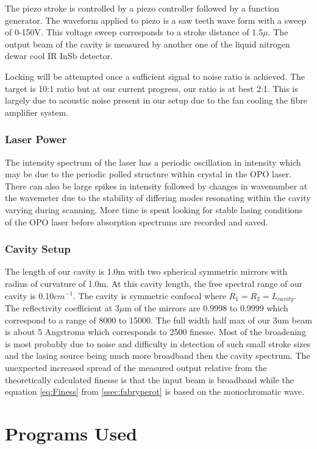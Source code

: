 \documentclass[a4paper]{book}
\begin{document}
		The piezo stroke is controlled by a piezo controller followed by a function generator. The waveform applied to piezo is a saw teeth wave form with a sweep of 0-150V. This voltage sweep corresponds to a stroke distance of 1.5$\mu$. The output beam of the cavity is measured by another one of the liquid nitrogen dewar cool IR InSb detector. 
		
		Locking will be attempted once a sufficient signal to noise ratio is achieved. The target is 10:1 ratio but at our current progress, our ratio is at best 2:1. This is largely due to acoustic noise present in our setup due to the fan cooling the fibre amplifier system.

		\subsubsection{Laser Power}
			The intensity spectrum of the laser has a periodic oscillation in intensity which may be due to the periodic polled structure within crystal in the OPO laser. There can also be large spikes in intensity followed by changes in wavenumber at the wavemeter due to the stability of differing modes resonating within the cavity varying during scanning. More time is spent looking for stable lasing conditions of the OPO laser before absorption spectrums are recorded and saved.
		\subsubsection{Cavity Setup}
			The length of our cavity is 1.0m with two spherical symmetric mirrors with radius of curvature of 1.0m. At this cavity length, the free spectral range of our cavity is 0.10$cm^{-1}$. The cavity is symmetric confocal where $R_1=R_2=L_{cavity}$. The reflectivity coefficient at 3$\mu$m of the mirrors are 0.9998 to 0.9999 which correspond to a range of 8000 to 15000. The full width half max of our 3um beam is about 5 Angstroms which corresponds to 2500 finesse. Most of the broadening is most probably due to noise and difficulty in detection of such small stroke sizes and the lasing source being much more broadband then the cavity spectrum. The unexpected increased spread of the measured output relative from the theoretically calculated finesse is that the input beam is broadband while the equation \ref{eq:Finess} from \ref{ssec:fabryperot} is based on the monochromatic wave.

	\section{Programs Used}
\end{document}
